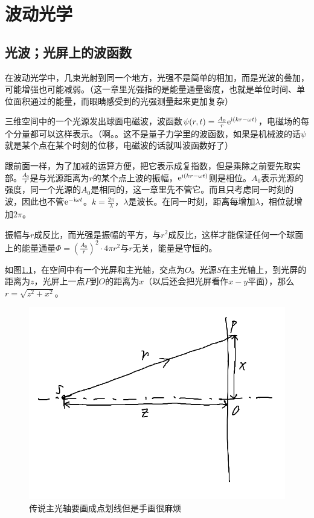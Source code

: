\chapter{波动光学}
\section{光波；光屏上的波函数}
在波动光学中，几束光射到同一个地方，光强不是简单的相加，而是光波的叠加，可能增强也可能减弱。（这一章里光强指的是能量通量密度，也就是单位时间、单位面积通过的能量，而眼睛感受到的光强测量起来更加复杂）

三维空间中的一个光源发出球面电磁波，波函数$\psi(r,t)=\frac{A_0}{r} \mathrm{e}^{\mathrm{i}(k r-\omega t)}$，电磁场的每个分量都可以这样表示。（啊。。这不是量子力学里的波函数，如果是机械波的话$\psi$就是某个点在某个时刻的位移，电磁波的话就叫波函数好了）

跟前面一样，为了加减的运算方便，把它表示成复指数，但是乘除之前要先取实部。$\frac{A_0}{r}$是与光源距离为$r$的某个点上波的振幅，$\mathrm{e}^{\mathrm{i}(k r-\omega t)}$则是相位。$A_0$表示光源的强度，同一个光源的$A_0$是相同的，这一章里先不管它。而且只考虑同一时刻的波，因此也不管$\mathrm{e}^{-\mathrm{i} \omega t}$。$k=\frac{2 \pi}{\lambda}$，$\lambda$是波长。在同一时刻，距离每增加$\lambda$，相位就增加$2 \pi$。

振幅与$r$成反比，而光强是振幅的平方，与$r^2$成反比，这样才能保证任何一个球面上的能量通量$\Phi=(\frac{A_0}{r})^2 \cdot 4 \pi r^2$与$r$无关，能量是守恒的。

如图\ref{fig-wave-amp}，在空间中有一个光屏和主光轴，交点为$O$。光源$S$在主光轴上，到光屏的距离为$z$，光屏上一点$P$到$O$的距离为$x$（以后还会把光屏看作$x-y$平面），那么$r=\sqrt{z^2+x^2}$。
\begin{figure}[htb]
\centering
\includegraphics[scale=0.5]{fig/wave-amp}
\caption{传说主光轴要画成点划线但是手画很麻烦}
\label{fig-wave-amp}
\end{figure}

